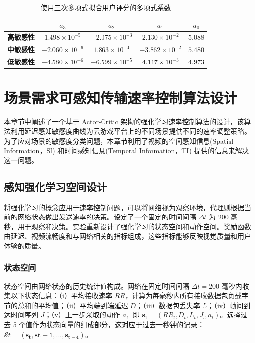 \begin{table}[ht]
\caption{使用三次多项式拟合用户评分的多项式系数}
\renewcommand\arraystretch{1.25}
\centering
\begin{tabular}{@{}ccccc@{}}
\toprule
\textbf{}                              & \textbf{$a_3$}          & \textbf{$a_2$}          & \textbf{$a_1$}         & \textbf{$a_0$} \\ \midrule
\multicolumn{1}{c|}{\textbf{高敏感性}}  & $1.498 \times 10^{-5}$   & $-2.075 \times 10^{-3}$   & $2.130 \times 10^{-2}$  & $5.088$        \\

\multicolumn{1}{c|}{\textbf{中敏感性}} & $- 2.060 \times 10^{-6}$ & $1.863 \times 10^{-4}$   & $-3.862 \times 10^{-2}$ & $5.480$        \\
\multicolumn{1}{c|}{\textbf{低敏感性}}  & $- 4.580 \times 10^{-6}$ & $- 6.599 \times 10^{-5}$ & $4.117 \times 10^{-3}$  & $4.973$        \\ \bottomrule
\end{tabular}
\label{tab:a3a2a1a0}
\end{table}


\section{场景需求可感知传输速率控制算法设计}
本章节中阐述了一个基于 Actor-Critic 架构的强化学习速率控制算法的设计，该算法利用延迟感知敏感度曲线为云游戏平台上的不同场景提供不同的速率调整策略。为了应对场景的敏感度分类问题，本章节利用了视频的空间感知信息(Spatial Information，SI) 和时间感知信息(Temporal Information，TI) 提供的信息来解决这一问题。

\subsection{感知强化学习空间设计}\label{sec:rl-design}
将强化学习的概念应用于速率控制问题，可以将网络视为观察环境，代理则根据当前的网络状态做出发送速率的决策。设定了一个固定的时间间隔 $\Delta t$ 为 200 毫秒，用于观察和决策。实验重新设计了强化学习的状态空间和动作空间。奖励函数由延迟、视频流畅度和与网络相关的指标组成，这些指标能够反映视觉质量和用户体验的质量。

\subsubsection{状态空间}
状态空间由网络状态的历史统计值构成。网络在固定时间间隔 $\Delta t = 200$ 毫秒内收集以下状态信息：（i）平均接收速率 $RR$，计算为每毫秒内所有接收数据包负载字节的总和的平均值；（ii）平均端到端延迟 $D$；（iii）数据包丢失率 $L$；（iv）帧间到达时间序列 $J$；（v）上一步采取的动作 $a$，即 $\boldsymbol{s_t} = (RR_t, D_t, L_t, J_t, a_t)$。选择过去 5 个值作为状态向量的组成部分，这对应于过去一秒钟的记录：$\mathcal{S}t = (\boldsymbol{s_t}, \boldsymbol{s{t-1}}, ..., \boldsymbol{s_{t-4}})$。


